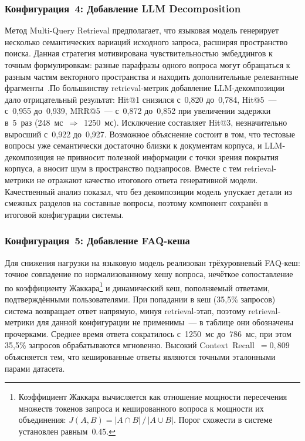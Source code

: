 \documentclass{article}
\begin{document}
\subsubsection{Конфигурация~4: Добавление LLM Decomposition}

Метод Multi-Query Retrieval предполагает, что языковая модель генерирует несколько семантических вариаций исходного запроса, расширяя пространство поиска. Данная стратегия мотивирована чувствительностью эмбеддингов к точным формулировкам: разные парафразы одного вопроса могут обращаться к разным частям векторного пространства и находить дополнительные релевантные фрагменты~\cite{3}.По большинству retrieval-метрик добавление LLM-декомпозиции дало отрицательный результат: Hit@1 снизился с~0{,}820 до~0{,}784, Hit@5~--- с~0{,}955 до~0{,}939, MRR@5~--- с~0{,}872 до~0{,}852 при увеличении задержки в~5~раз (248~мс~$\Rightarrow$~1250~мс). Исключение составляет Hit@3, незначительно выросший с~0{,}922 до~0{,}927. Возможное объяснение состоит в том, что тестовые вопросы уже семантически достаточно близки к документам корпуса, и LLM-декомпозиция не привносит полезной информации с точки зрения покрытия корпуса, а вносит шум в пространство подзапросов. Вместе с тем retrieval-метрики не отражают качество итогового ответа генеративной модели. Качественный анализ показал, что без декомпозиции модель упускает детали из смежных разделов на составные вопросы, поэтому компонент сохранён в итоговой конфигурации системы.


\subsubsection{Конфигурация~5: Добавление FAQ-кеша}





Для снижения нагрузки на языковую модель реализован трёхуровневый FAQ-кеш: точное совпадение по нормализованному хешу вопроса, нечёткое сопоставление по коэффициенту Жаккара\footnote{Коэффициент Жаккара вычисляется как отношение мощности пересечения множеств токенов запроса и кешированного вопроса к мощности их объединения: $J(A,B) = |A \cap B|\,/\,|A \cup B|$. Порог схожести в системе установлен равным~$0.45$.} и динамический кеш, пополняемый ответами, подтверждёнными пользователями. При попадании в кеш (35{,}5\% запросов) система возвращает ответ напрямую, минуя retrieval-этап, поэтому retrieval-метрики для данной конфигурации не применимы~--- в таблице они обозначены прочерками. Среднее время ответа сократилось с~1250~мс до~786~мс, при этом 35{,}5\% запросов обрабатываются мгновенно. Высокий Context~Recall~$= 0{,}809$ объясняется тем, что кешированные ответы являются точными эталонными парами датасета.
\end{document}
